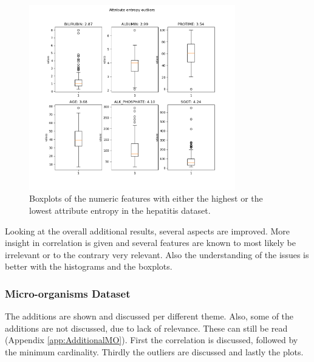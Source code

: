 \documentclass[10pt,a4paper]{article}
\begin{document}
\begin{itemize}
\begin{enumerate}
			\begin{figure}[H]
				\centering
				\includegraphics[width=0.8\textwidth]{Hep_AttEnt_Num.png}
				\caption{Boxplots of the numeric features with either the highest or the lowest attribute entropy in the hepatitis dataset.}
				\label{fig:HepAttEntNum}
			\end{figure}
			
		\end{enumerate}
			
	\end{itemize}

	Looking at the overall additional results, several aspects are improved. More insight in correlation is given and several features are known to most likely be irrelevant or to the contrary very relevant. Also the understanding of the issues is better with the histograms and the boxplots.
	
	\subsubsection{Micro-organisms Dataset}
	\label{subsec:AdditionalResultMO}
	
	The additions are shown and discussed per different theme. Also, some of the additions are not discussed, due to lack of relevance. These can still be read (Appendix \ref{app:AdditionalMO}). First the correlation is discussed, followed by the minimum cardinality. Thirdly the outliers are discussed and lastly the plots.
		
\end{document}
